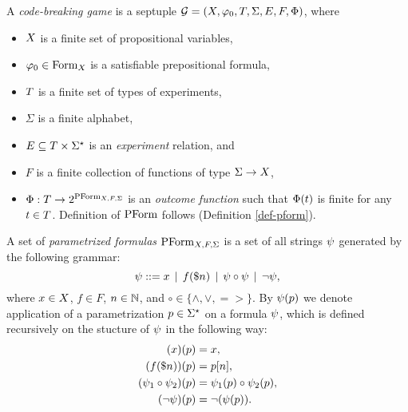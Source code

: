 \begin{definition} \label{def-game}
A \emph{code-breaking game} is a septuple
  $\mathcal{G} = (X, \varphi_0, T, \Sigma, E, F, \Phi)$, where
  \begin{itemize}
  \item $X$ is a finite set of propositional variables,
  \item $\varphi_0 \in \textrm{Form}_X$ is a satisfiable prepositional formula,
  \item $T$ is a finite set of types of experiments,
  \item $\Sigma$ is a finite alphabet,
  \item $E \subseteq T \times \Sigma^\star$ is an \emph{experiment} relation,
  and
  \item $F$ is a finite collection of functions of type $\Sigma -> X$,
  \item $\Phi: T -> 2^{\textrm{PForm}_{X,F,\Sigma}}$ is an
  \emph{outcome function} such that $\Phi(t)$ is finite
  for any $t\in T$. Definition of $\textrm{PForm}$ follows (Definition \ref{def-pform}).
  \end{itemize}
\end{definition}

\begin{definition} \label{def-pform}
A set of \emph{parametrized formulas} $\textrm{PForm}_{X,F,\Sigma}$ is a set of
 all strings $\psi$ generated by the following grammar:
$$ \psi ::= x \:\:|\:\: f(\$n) \:\:|\:\: \psi \circ \psi \:\:|\:\: \neg \psi,$$
where $x\in X$, $f\in F$, $n \in\mathbb{N}$, and $\circ\in\{\wedge, \vee, =>\}$.
By $\psi(p)$ we denote application of a parametrization $p\in\Sigma^\star$
on a formula $\psi$, which is defined recursively on the stucture of $\psi$ in the following way:
\begin{align}
(x)(p) &= x, \\
(f(\$n))(p) &= p[n],\\
(\psi_1\circ\psi_2)(p) &= \psi_1(p) \circ \psi_2(p),\\
(\neg\psi)(p) &= \neg(\psi(p)).
\end{align}
\end{definition}



